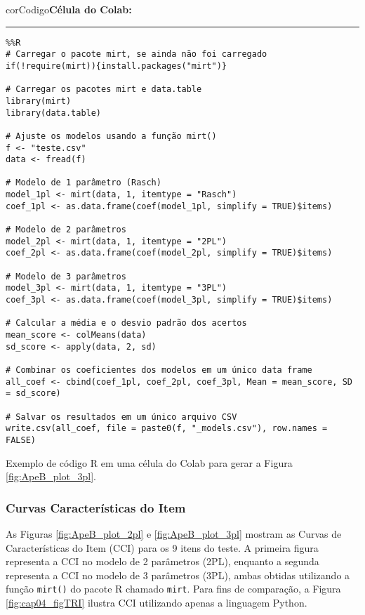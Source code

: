 \begin{listing}[!ht]
    \begin{myboxCode}{corCodigo}{\textbf{Célula do Colab: }}\vspace{3mm}
    \hrule
    \begin{verbatim}
%%R
# Carregar o pacote mirt, se ainda não foi carregado
if(!require(mirt)){install.packages("mirt")}

# Carregar os pacotes mirt e data.table
library(mirt)
library(data.table)

# Ajuste os modelos usando a função mirt()
f <- "teste.csv"
data <- fread(f)

# Modelo de 1 parâmetro (Rasch)
model_1pl <- mirt(data, 1, itemtype = "Rasch")
coef_1pl <- as.data.frame(coef(model_1pl, simplify = TRUE)$items)

# Modelo de 2 parâmetros
model_2pl <- mirt(data, 1, itemtype = "2PL")
coef_2pl <- as.data.frame(coef(model_2pl, simplify = TRUE)$items)

# Modelo de 3 parâmetros
model_3pl <- mirt(data, 1, itemtype = "3PL")
coef_3pl <- as.data.frame(coef(model_3pl, simplify = TRUE)$items)

# Calcular a média e o desvio padrão dos acertos
mean_score <- colMeans(data)
sd_score <- apply(data, 2, sd)

# Combinar os coeficientes dos modelos em um único data frame
all_coef <- cbind(coef_1pl, coef_2pl, coef_3pl, Mean = mean_score, SD = sd_score)

# Salvar os resultados em um único arquivo CSV
write.csv(all_coef, file = paste0(f, "_models.csv"), row.names = FALSE)
\end{verbatim}
\end{myboxCode}
\caption{Exemplo de código R em uma célula do Colab para gerar a Figura \ref{fig:ApeB_plot_3pl}.}
\label{lst:tri_estatisticas}
\end{listing}

\subsubsection{Curvas Características do Item}\label{sec:apeB_cci}

As Figuras \ref{fig:ApeB_plot_2pl} e \ref{fig:ApeB_plot_3pl} mostram as Curvas de Características do Item (CCI) para os 9 itens do teste. A primeira figura representa a CCI no modelo de 2 parâmetros (2PL), enquanto a segunda representa a CCI no modelo de 3 parâmetros (3PL), ambas obtidas utilizando a função \verb|mirt()| do pacote R chamado \verb|mirt|. Para fins de comparação, a Figura \ref{fig:cap04_figTRI} ilustra CCI utilizando apenas a linguagem Python.

